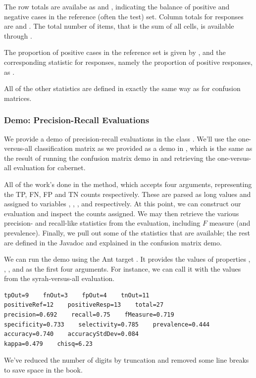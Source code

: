 The row totals are availabe as  and
, indicating the balance of positive and
negative cases in the reference (often the test) set.  Column totals
for responses are  and
.  The total number of items, that is the
sum of all cells, is available through .

The proportion of positive cases in the reference set is given by
, and the corresponding statistic for
responses, namely the proportion of positive responses, as
.  

All of the other statistics are defined in exactly the same way as for
confusion matrices.

\subsubsection{Demo: Precision-Recall Evaluations}

We provide a demo of precision-recall evaluations in the class
.  We'll use the one-versus-all
classification matrix as we provided as a demo in
, which is the same as the result of
running the confusion matrix demo in
 and retrieving the
one-versus-all evaluation for cabernet.

All of the work's done in the  method, which accepts four
arguments, representing the TP, FN, FP and TN counts respectively.
These are parsed as long values and assigned to variables ,
, , and  respectively.  At this point,
we can construct our evaluation and inspect the counts assigned.
%
%
We may then retrieve the various precision- and recall-like statistics
from the evaluation, including $F$ measure (and prevalence).
%
%
Finally, we pull out some of the statistics that are available; the
rest are defined in the Javadoc and explained in the confusion matrix
demo.
%

We can run the demo using the Ant target .  It
provides the values of properties , , , and
 as the first four arguments.  For instance, we can call it
with the values from the syrah-versus-all evaluation.
%
\begin{verbatim}
tpOut=9    fnOut=3    fpOut=4    tnOut=11
positiveRef=12    positiveResp=13    total=27
precision=0.692    recall=0.75    fMeasure=0.719
specificity=0.733    selectivity=0.785    prevalence=0.444
accuracy=0.740    accuracyStdDev=0.084
kappa=0.479    chisq=6.23
\end{verbatim}
%
We've reduced the number of digits by truncation and removed some
line breaks to save space in the book.


